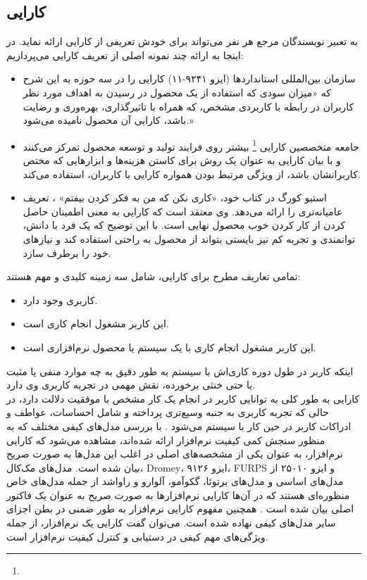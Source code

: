 \documentclass{article}
\theoremstyle{definition}
\begin{document}
	\subsection{کارایی}
به تعبیر نویسندگان مرجع
\cite{measuring}
هر نفر می‌تواند برای خودش تعریفی از کارایی ارائه نماید. در اینجا به ارائه چند نمونه اصلی از تعریف کارایی می‌پردازیم:
\begin{itemize}
	\item
	سازمان بین‌المللی استانداردها (ایزو ۹۲۴۱-۱۱) کارایی را در سه حوزه به این شرح که «میزان سودی که استفاده از یک محصول در رسیدن به اهداف مورد نظر کاربران در رابطه با کاربردی مشخص، که همراه با تاثیرگذاری، بهره‌وری و رضایت باشد، کارایی آن محصول نامیده می‌شود.»
	\item 
	جامعه متخصصین کارایی
	\footnote{}
	بیشتر روی فرایند تولید و توسعه محصول تمرکز می‌کنند و با بیان کارایی به عنوان یک روش برای کاستن هزینه‌ها و ابزارهایی که مختص کاربرانشان باشد، از ویژگی مرتبط بودن همواره کارایی با کاربران، استفاده می‌کند.
	\item 
	استیو کورگ در کتاب خود، «کاری نکن که من به فکر کردن بیفتم»
		\cite{don't make me think}،
	تعریف عامیانه‌تری را ارائه می‌دهد. وی معتقد است که کارایی به معنی اطمینان حاصل کردن از کار کردن خوب محصول نهایی است. با این توضیح که یک فرد با دانش، توانمندی و تجربه کم نیز بایستی بتواند از محصول به راحتی استفاده کند و نیازهای خود را برطرف سازد.
\end{itemize}
تمامی تعاریف مطرح برای کارایی، شامل سه زمینه کلیدی و مهم هستند:
\begin{itemize}
	\item کاربری وجود دارد.
	\item این کاربر مشغول انجام کاری است.
	\item این کاربر مشغول انجام کاری با یک سیستم یا محصول نرم‌افزاری است.
\end{itemize}
اینکه کاربر در طول دوره کاری‌اش با سیستم به طور دقیق به چه موارد منفی یا مثبت یا حتی خنثی برخورده، نقش مهمی در تجربه کاربری وی دارد. \\
کارایی به طور کلی به توانایی کاربر در انجام یک کار مشخص با موفقیت دلالت دارد، در حالی که تجربه کاربری به جنبه وسیع‌تری پرداخته و شامل احساسات، عواطف و ادراکات کاربر در حین کار با سیستم می‌شود
\cite{measuring}.
با بررسی مدل‌های کیفی مختلف که به منظور سنجش کمی کیفیت نرم‌افزار ارائه شده‌اند، مشاهده می‌شود که کارایی نرم‌افزار، به عنوان یکی از مشخصه‌های اصلی در اغلب این مدل‌ها به صورت صریح  بیان شده است. مدل‌های مک‌کال، Dromey، ایزو ۹۱۲۶، FURPS و ایزو ۲۵۰۱۰ از مدل‌های اساسی و مدل‌های برتوئا، گکوآمو، آلوارو و راواشد از جمله مدل‌های خاص منظوره‌ای هستند که در آن‌ها کارایی نرم‌افزارها به صورت صریح به عنوان یک فاکتور اصلی بیان شده است 
\cite{pressman}.
همچنین مفهوم کارایی نرم‌افزار به طور ضمنی در بطن اجزای سایر مدل‌های کیفی نهاده شده است. می‌توان گفت کارایی یک نرم‌افزار، از جمله ویژگی‌های مهم کیفی در دستیابی و کنترل کیفیت نرم‌افزار است.
\end{document}

